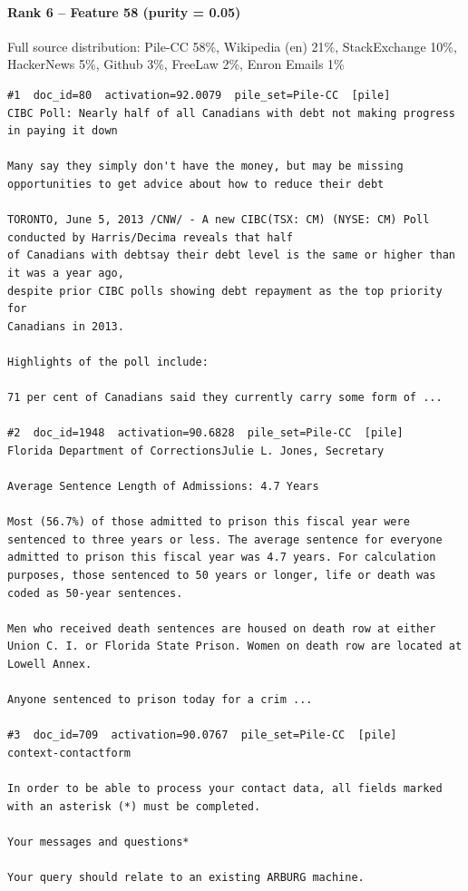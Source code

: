 \paragraph*{Rank 6 -- Feature 58 (purity = 0.05)}

Full source distribution: Pile-CC 58\%, Wikipedia (en) 21\%, StackExchange 10\%, HackerNews 5\%, Github 3\%, FreeLaw 2\%, Enron Emails 1\%

\begin{verbatim}
#1  doc_id=80  activation=92.0079  pile_set=Pile-CC  [pile]
CIBC Poll: Nearly half of all Canadians with debt not making progress in paying it down

Many say they simply don't have the money, but may be missing
opportunities to get advice about how to reduce their debt

TORONTO, June 5, 2013 /CNW/ - A new CIBC(TSX: CM) (NYSE: CM) Poll conducted by Harris/Decima reveals that half
of Canadians with debtsay their debt level is the same or higher than it was a year ago,
despite prior CIBC polls showing debt repayment as the top priority for
Canadians in 2013.

Highlights of the poll include:

71 per cent of Canadians said they currently carry some form of ...

#2  doc_id=1948  activation=90.6828  pile_set=Pile-CC  [pile]
Florida Department of CorrectionsJulie L. Jones, Secretary

Average Sentence Length of Admissions: 4.7 Years

Most (56.7%) of those admitted to prison this fiscal year were sentenced to three years or less. The average sentence for everyone admitted to prison this fiscal year was 4.7 years. For calculation purposes, those sentenced to 50 years or longer, life or death was coded as 50-year sentences.

Men who received death sentences are housed on death row at either Union C. I. or Florida State Prison. Women on death row are located at Lowell Annex.

Anyone sentenced to prison today for a crim ...

#3  doc_id=709  activation=90.0767  pile_set=Pile-CC  [pile]
context-contactform

In order to be able to process your contact data, all fields marked with an asterisk (*) must be completed.

Your messages and questions*

Your query should relate to an existing ARBURG machine.


\end{verbatim}
